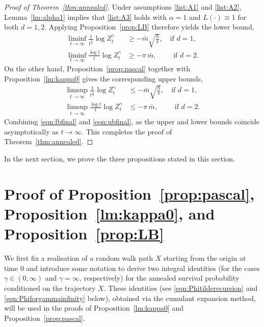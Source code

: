 \documentclass{article}[12pt]
\theoremstyle{definition}
\newcommand{\1}{\mathbbm{1}}
\begin{document}
\begin{proof}[Proof of Theorem~\ref{thm:annealed}]
Under assumptions \ref{list:A1} and \ref{list:A2},  Lemma~\ref{lm:alpha1} implies that \ref{list:A3} holds with $\alpha = 1$ and $L(\cdot) \equiv 1$ for both $d=1,2$. Applying Proposition~\ref{prop:LB}  therefore yields the lower bound,
\begin{equation}
    \begin{split}
       \liminf_{t\to \infty}\frac{1}{t^{\frac{1}{2}}} \log Z^{\gamma}_t &\ge  - \bar{m} \sqrt{\frac{8}{\pi}}, \quad \text{if } d=1,\\
       \liminf_{t\to \infty}\frac{\log t}{t} \log Z^{\gamma}_t &\ge  - {\pi\,\bar{m}},\,\,\qquad \text{if } d=2.
        \label{eqn:lbfinal}
        \end{split}
    \end{equation}
On the other hand, Proposition~\ref{prop:pascal} together with
Proposition~\ref{lm:kappa0} gives the corresponding upper bounds,
\begin{equation}
    \begin{split}
       \limsup_{t\to \infty}\frac{1}{t^{\frac{1}{2}}} \log Z^{\gamma}_t &\le  - \bar{m} \sqrt{\frac{8}{\pi}}, \quad \text{if } d=1,\\
       \limsup_{t\to \infty}\frac{\log t}{t} \log Z^{\gamma}_t &\le  - {\pi\,\bar{m}},\,\,\qquad \text{if } d=2. 
        \label{eqn:ubfinal}
        \end{split}
    \end{equation}
   Combining \eqref{eqn:lbfinal} and \eqref{eqn:ubfinal}, as the upper and lower bounds coincide asymptotically as $t\to \infty$. This completes the proof of Theorem~\ref{thm:annealed}.
\end{proof}

In the next section, we prove the three propositions stated in this section.

\section{Proof of Proposition~\ref{prop:pascal}, Proposition~\ref{lm:kappa0},  and Proposition~\ref{prop:LB}}
\label{proofpropositions}
We first fix a realisation of a random walk path $X$ starting from the origin at time $0$ and introduce some notation to derive two integral identities (for the cases $\gamma \in (0,\infty)$ and $\gamma = \infty$, respectively) for the annealed survival probability conditioned on the trajectory $X$. These identities (see \eqref{eqn:Phitilderecursion} and \eqref{eqn:Phiforgammainfinity} below), obtained via the cumulant expansion method, will be used in the proofs of Proposition~\ref{lm:kappa0} and Proposition~\ref{prop:pascal}.
\end{document}
